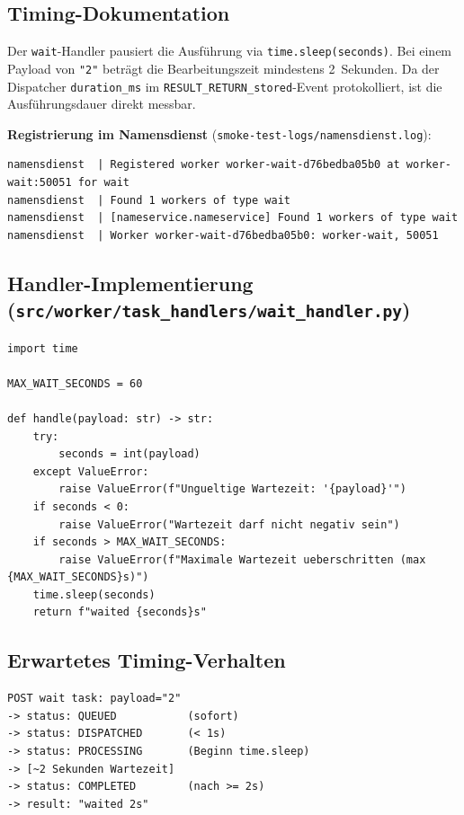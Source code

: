 \documentclass[a4paper,12pt]{article}
\begin{document}
\subsection*{Timing-Dokumentation}

Der \texttt{wait}-Handler pausiert die Ausführung via \texttt{time.sleep(seconds)}. Bei einem Payload von \texttt{"2"} beträgt die Bearbeitungszeit mindestens 2~Sekunden. Da der Dispatcher \texttt{duration\_ms} im \texttt{RESULT\_RETURN\_stored}-Event protokolliert, ist die Ausführungsdauer direkt messbar.

\textbf{Registrierung im Namensdienst} (\texttt{smoke-test-logs/namensdienst.log}):
\begin{lstlisting}[style=log]
namensdienst  | Registered worker worker-wait-d76bedba05b0 at worker-wait:50051 for wait
namensdienst  | Found 1 workers of type wait
namensdienst  | [nameservice.nameservice] Found 1 workers of type wait
namensdienst  | Worker worker-wait-d76bedba05b0: worker-wait, 50051
\end{lstlisting}

\subsection*{Handler-Implementierung (\texttt{src/worker/task\_handlers/wait\_handler.py})}

\begin{lstlisting}[style=python]
import time

MAX_WAIT_SECONDS = 60

def handle(payload: str) -> str:
    try:
        seconds = int(payload)
    except ValueError:
        raise ValueError(f"Ungueltige Wartezeit: '{payload}'")
    if seconds < 0:
        raise ValueError("Wartezeit darf nicht negativ sein")
    if seconds > MAX_WAIT_SECONDS:
        raise ValueError(f"Maximale Wartezeit ueberschritten (max {MAX_WAIT_SECONDS}s)")
    time.sleep(seconds)
    return f"waited {seconds}s"
\end{lstlisting}

\subsection*{Erwartetes Timing-Verhalten}

\begin{lstlisting}[style=log]
POST wait task: payload="2"
-> status: QUEUED           (sofort)
-> status: DISPATCHED       (< 1s)
-> status: PROCESSING       (Beginn time.sleep)
-> [~2 Sekunden Wartezeit]
-> status: COMPLETED        (nach >= 2s)
-> result: "waited 2s"
\end{lstlisting}
\end{document}
